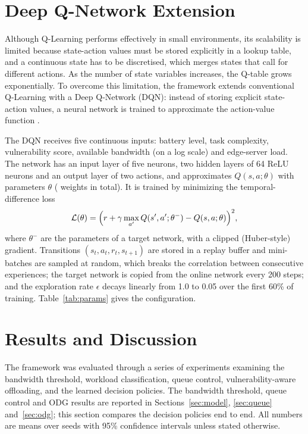 \documentclass{ieeeaccess}
\begin{document}
\section{Deep Q-Network Extension}
\label{sec:dqn}
Although Q-Learning performs effectively in small environments, its scalability is limited because state-action values must be stored explicitly in a lookup table, and a continuous state has to be discretised, which merges states that call for different actions. As the number of state variables increases, the Q-table grows exponentially. To overcome this limitation, the framework extends conventional Q-Learning with a Deep Q-Network (DQN): instead of storing explicit state-action values, a neural network is trained to approximate the action-value function \cite{yang2022,anand2026,sun2026}.

The DQN receives five continuous inputs: battery level, task complexity, vulnerability score, available bandwidth (on a log scale) and edge-server load. The network has an input layer of five neurons, two hidden layers of 64 ReLU neurons and an output layer of two actions, and approximates $Q(s,a;\theta)$ with parameters $\theta$ (\DqnParams{} weights in total). It is trained by minimizing the temporal-difference loss \cite{tang2022,yang2022}
\begin{equation}
\mathcal{L}(\theta) = \Bigl(r + \gamma \max_{a'} Q(s',a';\theta^{-}) - Q(s,a;\theta)\Bigr)^{2},
\end{equation}
where $\theta^{-}$ are the parameters of a target network, with a clipped (Huber-style) gradient. Transitions $(s_t,a_t,r_t,s_{t+1})$ are stored in a replay buffer and mini-batches are sampled at random, which breaks the correlation between consecutive experiences; the target network is copied from the online network every 200 steps; and the exploration rate $\epsilon$ decays linearly from 1.0 to 0.05 over the first 60\% of training. Table~\ref{tab:params} gives the configuration.
\section{Results and Discussion}
\label{sec:results}
The framework was evaluated through a series of experiments examining the bandwidth threshold, workload classification, queue control, vulnerability-aware offloading, and the learned decision policies. The bandwidth threshold, queue control and ODG results are reported in Sections~\ref{sec:model}, \ref{sec:queue} and~\ref{sec:odg}; this section compares the decision policies end to end. All numbers are means over \NSeeds{} seeds with 95\% confidence intervals unless stated otherwise.
\end{document}
